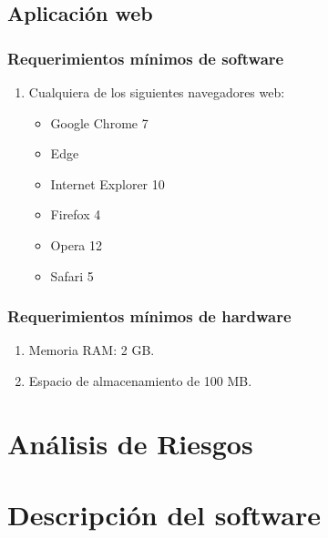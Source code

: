     \subsection{Aplicación web}
    \subsubsection{Requerimientos mínimos de software}
    \begin{enumerate}
        \item Cualquiera de los siguientes navegadores web:
        \begin{itemize}
            \item Google Chrome 7
            \item Edge
            \item Internet Explorer 10
            \item Firefox 4
            \item Opera 12
            \item Safari 5
        \end{itemize}
    \end{enumerate}
    \subsubsection{Requerimientos mínimos de hardware}
    \begin{enumerate}
        \item Memoria RAM: 2 GB.
        \item Espacio de almacenamiento de 100 MB.
    \end{enumerate}

\section{Análisis de Riesgos}

\newpage   
\section{Descripción del software}


